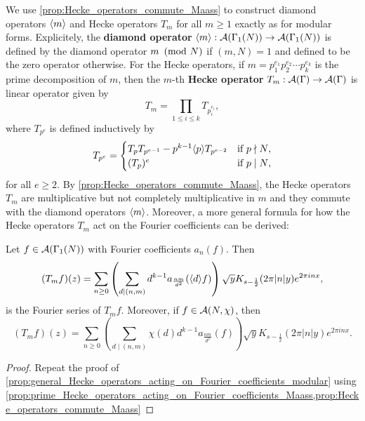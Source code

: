       We use \cref{prop:Hecke_operators_commute_Maass} to construct diamond operators $\langle m\rangle$ and Hecke operators $T_{m}$ for all $m \ge 1$ exactly as for modular forms. Explicitely, the \textbf{diamond operator} $\langle m\rangle:\mathcal{A}(\Gamma_{1}(N)) \to \mathcal{A}(\Gamma_{1}(N))$ is defined by the diamond operator $m \ \left(\text{mod }N\right)$ if $(m,N) = 1$ and defined to be the zero operator otherwise. For the Hecke operators, if $m = p_{1}^{e_{1}}p_{2}^{e_{2}} \cdots p_{k}^{e_{k}}$ is the prime decomposition of $m$, then the $m$-th \textbf{Hecke operator} $T_{m}:\mathcal{A}(\Gamma) \to \mathcal{A}(\Gamma)$ is linear operator given by
      \[
        T_{m} = \prod_{1 \le i \le k}T_{p_{i}^{e_{i}}},
      \]
      where $T_{p^{e}}$ is defined inductively by
      \[
        T_{p^{e}} = \begin{cases} T_{p}T_{p^{e-1}}-p^{k-1}\langle p\rangle T_{p^{e-2}} & \text{if $p \nmid N$}, \\ (T_{p})^{e} & \text{if $p \mid N$}, \end{cases}
      \]
      for all $e \ge 2$. By \cref{prop:Hecke_operators_commute_Maass}, the Hecke operators $T_{m}$ are multiplicative but not completely multiplicative in $m$ and they commute with the diamond operators $\langle m\rangle$. Moreover, a more general formula for how the Hecke operators $T_{m}$ act on the Fourier coefficients can be derived:

      \begin{proposition}\label{prop:general_Hecke_operators_acting_on_Fourier_coefficients_Maass}
        Let $f \in \mathcal{A}(\Gamma_{1}(N))$ with Fourier coefficients $a_{n}(f)$. Then
        \[
          (T_{m}f)(z) = \sum_{n \ge 0}\left(\sum_{d \mid (n,m)}d^{k-1}a_{\frac{nm}{d^{2}}}(\langle d\rangle f)\right)\sqrt{y}K_{s-\frac{1}{2}}(2\pi|n|y)e^{2\pi inx},
        \]
        is the Fourier series of $T_{m}f$. Moreover, if $f \in \mathcal{A}(N,\chi)$, then
        \[
          (T_{m}f)(z) = \sum_{n \ge 0}\left(\sum_{d \mid (n,m)}\chi(d)d^{k-1}a_{\frac{nm}{d^{2}}}(f)\right)\sqrt{y}K_{s-\frac{1}{2}}(2\pi|n|y)e^{2\pi inx}.
        \]
      \end{proposition}
      \begin{proof}
        Repeat the proof of \cref{prop:general_Hecke_operators_acting_on_Fourier_coefficients_modular} using \cref{prop:prime_Hecke_operators_acting_on_Fourier_coefficients_Maass,prop:Hecke_operators_commute_Maass}
      \end{proof}
    \subsection*{}
    \subsection*{}

